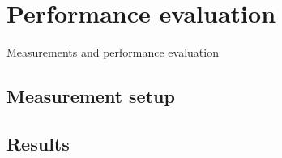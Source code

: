 \section{Performance evaluation}
\begin{frame}
	\begin{center}
	\huge{Measurements and performance evaluation}
	\end{center}
\end{frame}

\subsection*{Measurement setup}


\subsection*{Results}



